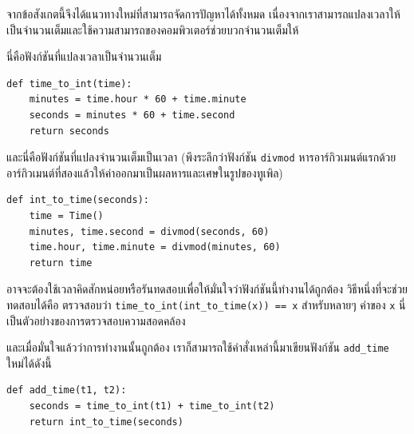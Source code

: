 จากข้อสังเกตนี้จึงได้แนวทางใหม่ที่สามารถจัดการปัญหาได้ทั้งหมด 
เนื่องจากเราสามารถแปลงเวลาให้เป็นจำนวนเต็มและใช้ความสามารถของคอมพิวเตอร์ช่วยบวกจำนวนเต็มให้


นี่คือฟังก์ชันที่แปลงเวลาเป็นจำนวนเต็ม

\begin{verbatim}
def time_to_int(time):
    minutes = time.hour * 60 + time.minute
    seconds = minutes * 60 + time.second
    return seconds
\end{verbatim}
%

และนี่คือฟังก์ชันที่แปลงจำนวนเต็มเป็นเวลา (พึงระลึกว่าฟังก์ชัน {\tt divmod} 
หารอาร์กิวเมนต์แรกด้วยอาร์กิวเมนต์ที่สองแล้วให้ค่าออกมาเป็นผลหารและเศษในรูปของทูเพิล)

\begin{verbatim}
def int_to_time(seconds):
    time = Time()
    minutes, time.second = divmod(seconds, 60)
    time.hour, time.minute = divmod(minutes, 60)
    return time
\end{verbatim}
%

อาจจะต้องใช้เวลาคิดสักหน่อยหรือรันทดสอบเพื่อให้มั่นใจว่าฟังก์ชันนี้ทำงานได้ถูกต้อง  วิธีหนึ่งที่จะช่วยทดสอบได้คือ ตรวจสอบว่า
\verb"time_to_int(int_to_time(x)) == x" สำหรับหลายๆ ค่าของ {\tt x} นี่เป็นตัวอย่างของการตรวจสอบความสอดคล้อง


และเมื่อมั่นใจแล้วว่าการทำงานนั้นถูกต้อง เราก็สามารถใช้คำสั่งเหล่านี้มาเขียนฟังก์ชัน \verb"add_time" ใหม่ได้ดังนี้

\begin{verbatim}
def add_time(t1, t2):
    seconds = time_to_int(t1) + time_to_int(t2)
    return int_to_time(seconds)
\end{verbatim}
%

